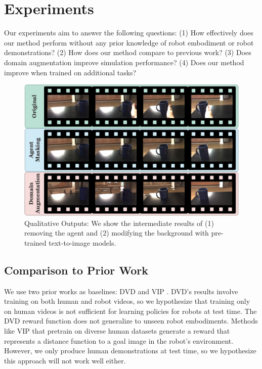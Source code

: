 \section{Experiments}
\label{sec:experiments_reward}

Our experiments aim to answer the following questions: (1) How effectively does our method perform without any prior knowledge of robot embodiment or robot demonstrations? (2) How does our method compare to previous work? (3) Does domain augmentation improve simulation performance? (4) Does our method improve when trained on additional tasks?

\begin{figure}[H]
\centering
\includegraphics[width=\linewidth]{figs_reward/qual_results.pdf}
\vspace{-0.2in}
   \caption{\small Qualitative Outputs: We show the intermediate results of (1) removing the agent and (2) modifying the background with pre-trained text-to-image models.}
    \label{fig:qual_outputs_reward}
    \vspace{-0.15in}
\end{figure}

\subsection{Comparison to Prior Work}


We use two prior works as baselines: DVD \cite{DVD} and VIP \cite{VIP}. DVD's results involve training on both human and robot videos, so we hypothesize that training only on human videos is not sufficient for learning policies for robots at test time. The DVD reward function does not generalize to unseen robot embodiments. Methods like VIP that pretrain on diverse human datasets generate a reward that represents a distance function to a goal image in the robot's environment. However, we only produce human demonstrations at test time, so we hypothesize this approach will not work well either.

